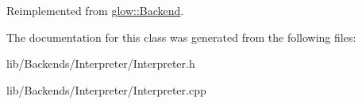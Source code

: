 Reimplemented from \hyperlink{classglow_1_1_backend_a19b5580a7274a1457bcdf3fc05f98cbd}{glow\+::\+Backend}.



The documentation for this class was generated from the following files\+:\begin{DoxyCompactItemize}
\item 
lib/\+Backends/\+Interpreter/Interpreter.\+h\item 
lib/\+Backends/\+Interpreter/Interpreter.\+cpp\end{DoxyCompactItemize}
